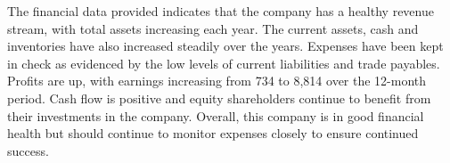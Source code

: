 

The financial data provided indicates that the company has a healthy revenue stream, with total assets increasing each year. The current assets, cash and inventories have also increased steadily over the years. Expenses have been kept in check as evidenced by the low levels of current liabilities and trade payables. Profits are up, with earnings increasing from 734 to 8,814 over the 12-month period. Cash flow is positive and equity shareholders continue to benefit from their investments in the company. Overall, this company is in good financial health but should continue to monitor expenses closely to ensure continued success.